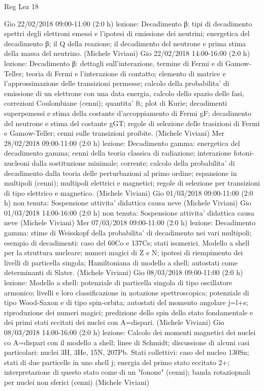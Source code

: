 \begin{frame}[allowframebreaks]{Reg Lez 18}
\begin{itemize}
    Gio 22/02/2018 09:00-11:00 (2:0 h) lezione: Decadimento β: tipi di decadimento spettri degli elettroni emessi e l'ipotesi di emissione dei neutrini; energetica del decadimento β; il Q della reazione; il decadimento del neutrone e prima stima della massa del neutrino. (Michele Viviani)
    Gio 22/02/2018 14:00-16:00 (2:0 h) lezione: Decadimento β: dettagli sull'interazione, termine di Fermi e di Gamow-Teller; teoria di Fermi e l'interazione di contatto; elemento di matrice e l'approssimazione delle transizioni permesse; calcolo della probabilita' di emissione di un elettrone con una data energia, calcolo dello spazio delle fasi, correzioni Coulombiane (cenni); quantita' ft; plot di Kurie; decadimenti superpemessi e stima della costante d'accoppiamento di Fermi gF; decadimento del neutrone e stima del costante gGT; regole di selezione delle trasizioni di Fermi e Gamow-Teller; cenni sulle transizioni proibite. (Michele Viviani)
    Mer 28/02/2018 09:00-11:00 (2:0 h) lezione: Decadimento gamma: energetica del decadimento gamma; cenni della teoria classica di radiazione; interazione fotoni-nucleoni dalla sostituzione minimale; corrente; calcolo della probabilita' di decadimento dalla teoria delle perturbazioni al primo ordine; espansione in multipoli (cenni); multipoli elettrici e magnetici; regole di selezione per transizioni di tipo elettrico e magnetico. (Michele Viviani)
    Gio 01/03/2018 09:00-11:00 (2:0 h) non tenuta: Sospensione attivita' didattica causa neve (Michele Viviani)
    Gio 01/03/2018 14:00-16:00 (2:0 h) non tenuta: Sospensione attivita' didattica causa neve (Michele Viviani)
    Mer 07/03/2018 09:00-11:00 (2:0 h) lezione: Decadimento gamma: stime di Weisskopf della probabilita' di decadimento nei vari multipoli; esempio di decadimenti: caso del 60Co e 137Cs; stati isomerici. Modello a shell per la struttura nucleare; numeri magici di Z e N; ipotesi di riempimento dei livelli di particella singola; Hamiltoniana di modello a shell; autostati come determinanti di Slater. (Michele Viviani)
    Gio 08/03/2018 09:00-11:00 (2:0 h) lezione: Modello a shell: potenziale di particella singola di tipo oscillatore armonico; livelli e loro classificazione in notazione spettroscopica; potenziale di tipo Wood-Saxon e di tipo spin-orbita; autostati del momento angolare j=l+s; riproduzione dei numeri magici; predizione dello spin dello stato fondamentale e dei primi stati eccitati dei nuclei con A=dispari. (Michele Viviani)
    Gio 08/03/2018 14:00-16:00 (2:0 h) lezione: Calcolo dei momenti magnetici dei nuclei co A=dispari con il modello a shell; linee di Schmidt; discussione di alcuni casi particolari: nuclei 3H, 3He, 15N, 207Pb. Stati collettivi: caso del nucleo 130Sn; stati di due particelle in uno shell j; energia del primo stato eccitato 2+; interpretazione di questo stato come di un "fonone" (cenni); banda rotaziopnali per nuclei non sferici (cenni) (Michele Viviani)

\end{itemize}
\end{frame}
